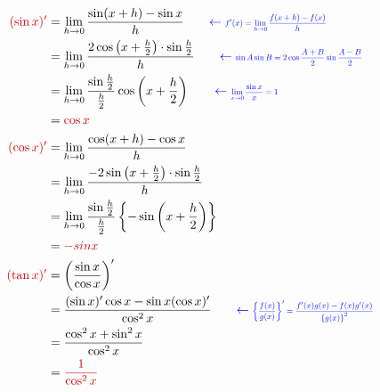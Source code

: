 \documentclass[../main]{subfiles}
\begin{document}
\begin{align*}
    \EmLight{(\sin x)'} &= \lim_{h\to 0}\frac{\sin(x+h)-\sin x}{h}
    \qquad \ExprNote{f'(x) = \lim_{h\to 0}\frac{f(x+h)-f(x)}{h}} \\
    &= \lim_{h\to 0}\frac{2\cos\left(x+\frac{h}{2}\right)\cdot\sin\frac{h}{2}}{h}
    \qquad \ExprNote{\sin A\sin B = 2\cos\frac{A+B}{2}\sin\frac{A-B}{2}} \\
    &= \lim_{h\to 0}\frac{\sin\frac{h}{2}}{\frac{h}{2}}\cos\left(x+\frac{h}{2}\right)
    \qquad \ExprNote{\lim_{x\to 0}\frac{\sin x}{x} = 1} \\
    &= \EmLight{\cos x} \\
    \EmLight{(\cos x)'} &= \lim_{h\to 0}\frac{\cos(x+h)-\cos x}{h} \\
    &= \lim_{h\to 0}\frac{-2\sin\left(x+\frac{h}{2}\right)\cdot\sin\frac{h}{2}}{h} \\
    &= \lim_{h\to 0}\frac{\sin\frac{h}{2}}{\frac{h}{2}}
    \left\{-\sin\left(x+\frac{h}{2}\right)\right\} \\
    &= \EmLight{-sin x} \\
    \EmLight{(\tan x)'} &= \left(\frac{\sin x}{\cos x}\right)' \\
    &= \frac{(\sin x)'\cos x - \sin x(\cos x)'}{\cos^2 x}
    \qquad \ExprNote{
        \left\{
            \frac{f(x)}{g(x)}
        \right\}' = \frac{f'(x)g(x)-f(x)g'(x)}
        {\left\{g(x)\right\}^2}
    } \\
    &= \frac{\cos^2 x + \sin^2 x}{\cos^2 x} \\
    &= \EmLight{\frac{1}{\cos^2 x}}
\end{align*}
\end{document}
